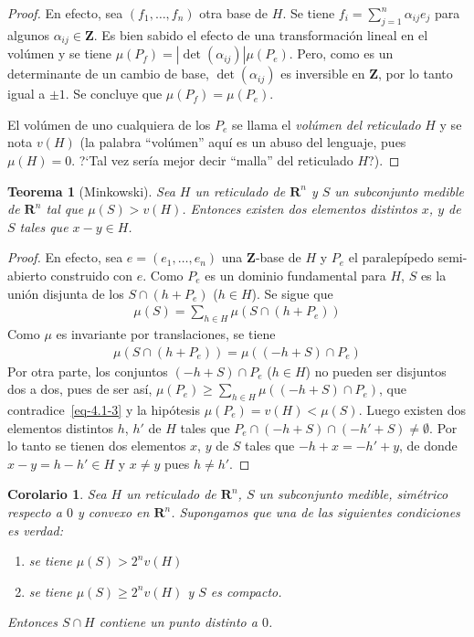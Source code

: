\documentclass[oneside,bibtotoc,leqno,spanish]{amsbook}
\newcommand{\RR}{\mathbf{R}}
\newcommand{\ZZ}{\mathbf{Z}}
\newcommand{\QED}{}%
\newcommand{\abs}[1]{\left\lvert#1\right\rvert}
\numberwithin{equation}{section}
\theoremstyle{defi}
\theoremstyle{note}
\newtheorem{theorem}{Teorema}
\newtheorem*{corollary*}{Corolario}
\theoremstyle{rem}
\numberwithin{theorem}{section}
\numberwithin{proposition}{section}
\numberwithin{definition}{section}
\numberwithin{lemma}{section}
\numberwithin{corollary}{section}
\numberwithin{example}{section}
\numberwithin{footnote}{section}%
\begin{document}
\begin{proof}
En efecto, sea $(f_{1},\dots,f_{n})$ otra base de $H$. Se tiene
$f_{i} = \sum_{j=1}^{n}\alpha_{ij}e_{j}$
para algunos $\alpha_{ij}\in\ZZ$. Es bien sabido el efecto de una transformaci\'on lineal
en el vol\'umen y
se tiene $\mu(P_{f}) = \abs{\det(\alpha_{ij})}\mu(P_{e})$. Pero, como es un determinante de
un cambio de base,
$\det(\alpha_{ij})$ es inversible en $\ZZ$, por lo tanto igual a $\pm 1$. Se concluye
que $\mu(P_{f}) = \mu(P_{e})$.

El vol\'umen de uno cualquiera de los $P_{e}$ se llama el {\em vol\'umen del reticulado} $H$
y se nota
$v(H)$ (la palabra ``vol\'umen'' aqu\'i es un abuso del lenguaje, pues $\mu(H) = 0$. ?`Tal
vez ser\'ia mejor decir ``malla'' del reticulado $H$?).
\end{proof}

\begin{theorem}[Minkowski]\label{teo4.1.2}
Sea $H$ un reticulado de $\RR^{n}$ y $S$ un subconjunto medible de $\RR^{n}$ tal
que $\mu(S) > v(H)$. Entonces existen
dos elementos distintos $x$, $y$ de $S$ tales que $x-y\in H$.
\end{theorem}

\begin{proof}
En efecto, sea $e = (e_{1},\dots,e_{n})$ una $\ZZ$-base de $H$ y $P_{e}$ el
paralep\'ipedo semi-abierto construido
con $e$. Como $P_{e}$ es un dominio fundamental para $H$, $S$ es la uni\'on disjunta de
los $S\cap (h+P_{e})$
($h\in H$). Se sigue que
\begin{gather}\label{eq-4.1-3}
\mu(S) = \sum_{h\in H}\mu(S\cap (h+P_{e}))
\end{gather}
Como $\mu$ es invariante por translaciones, se tiene
\begin{gather*}
\mu(S\cap (h+P_{e})) = \mu((-h+S)\cap P_{e})
\end{gather*}
Por otra parte, los conjuntos $(-h+S)\cap P_{e}$ ($h\in H$) no pueden ser disjuntos dos a
dos, pues de ser as\'i,
$\mu(P_{e})\geq\sum_{h\in H}\mu((-h+S)\cap P_{e})$, que contradice~\eqref{eq-4.1-3} y la
hip\'otesis $\mu(P_{e})=v(H)<\mu(S)$.
Luego existen dos elementos distintos $h$, $h'$ de $H$ tales que
$P_{e}\cap (-h+S)\cap (-h'+S)\neq\emptyset$.
Por lo tanto se tienen dos elementos $x$, $y$ de $S$ tales que $-h+x=-h'+y$, de donde
$x-y=h-h'\in H$ y
$x\neq y$ pues $h\neq h'$. \QED
\end{proof}

\begin{corollary*}
Sea $H$ un reticulado de $\RR^{n}$, $S$ un subconjunto medible, sim\'etrico respecto a
$0$ y convexo en $\RR^{n}$.
Supongamos que una de las siguientes condiciones es verdad:
\begin{enumerate}
\item[a)] se tiene $\mu(S) > 2^{n}v(H)$
\item[b)] se tiene $\mu(S)\geq 2^{n}v(H)$ y $S$ es compacto.
\end{enumerate}
Entonces $S\cap H$ contiene un punto distinto a $0$.
\end{corollary*}
\end{document}
